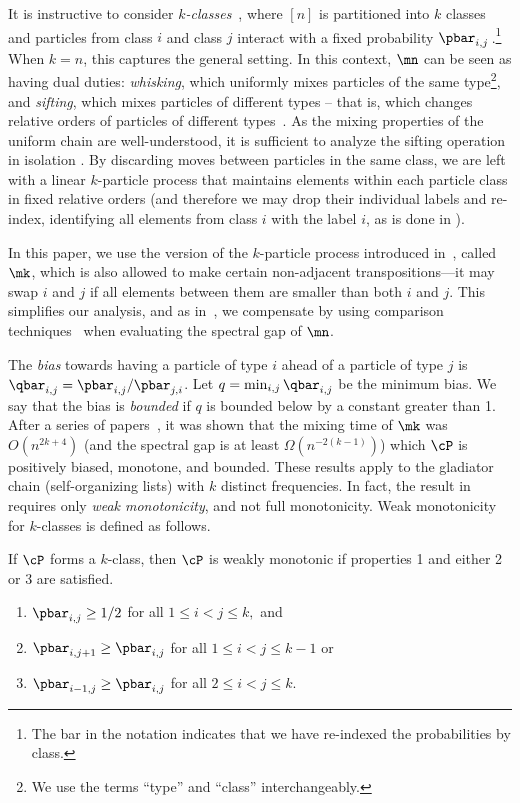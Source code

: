 It is instructive to consider \emph{$k$-classes}~\cite{MS}, where $[n]$ 
is partitioned into $k$ classes and particles from class $i$ and class 
$j$ interact with a fixed probability
%
%
$\pbar_{i,j}\,$.\footnote{The bar in   %
the notation indicates that we have re-indexed the probabilities by 
class.} %
When $k=n$, this captures the general setting. In this 
context, $\mn$ can be seen as having dual duties: \emph{whisking}, 
which uniformly mixes particles of the same type\footnote{We use the 
terms ``type'' and ``class'' interchangeably.}, and \emph{sifting}, 
which mixes particles of different types %
-- that is, which changes relative orders of particles of different types~\cite{HW16}. %
%
As the mixing properties of the uniform chain are well-understood, it is 
sufficient to analyze the sifting operation in
%
%
isolation \cite{HW16, MS}.  %
By discarding moves between particles in the same class, we are 
left with a linear $k$-particle process that maintains elements within 
each particle class in fixed relative orders (and therefore we may drop 
their individual labels and re-index, identifying all elements from 
class $i$ with the label $i$, as is done in ).

In this paper, we use the version of the $k$-particle process 
introduced in~\cite{MS}, called $\mk$, which is also allowed to make 
certain non-adjacent transpositions---it may swap $i$ and $j$ if all 
elements between them are smaller than both $i$ and $j$.  This 
simplifies our analysis, and as in~\cite{MS}, we compensate by using 
comparison techniques~\cite{dsc, RT98} when evaluating the spectral gap 
of $\mn$.
 
The \emph{bias} towards having a particle of type $i$ ahead of a 
particle of type $j$ is $\qbar_{i,j} = \pbar_{i,j}/\pbar_{j,i}$.  Let 
$q=\min_{i,j}\qbar_{i,j}$ be the minimum bias. We say that the bias is 
\emph{bounded} if $q$ is bounded below by a constant greater than 1. 
After a series of papers~\cite{HW16,MS}, it was shown that the mixing time
of $\mk$ was $O(n^{2k+4})$ (and the spectral 
gap is at least $\Omega(n^{-2(k-1)})$) 
which $\cP$ is positively biased, monotone, and bounded. %
%
%
%
%
%
%
These results apply to the 
gladiator chain (self-organizing lists) with $k$ distinct frequencies.  
In fact, the result in~\cite{MS} requires only \emph{weak 
monotonicity}, and not full monotonicity.  Weak monotonicity for 
$k$-classes is defined as follows.

\begin{definition}\label{mono} If $\cP$ forms a $k$-class, 
then $\cP$ is weakly monotonic if properties 1 and either 2 or 3 are satisfied.
\begin{enumerate}
\item $\pbar_{i,j} \geq 1/2$ for all $1 \leq i < j \leq k,$ and
\item $\pbar_{i,j+1} \geq \pbar_{i,j}$ for all $1 \leq i < j \leq k-1$ or
\item $\pbar_{i-1,j} \geq \pbar_{i,j}$ for all $2 \leq i < j \leq k.$
\end{enumerate}
\end{definition}

